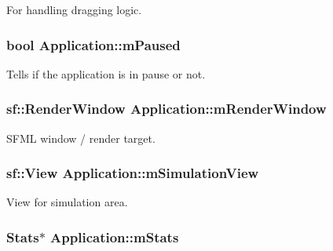 For handling dragging logic. 

\hypertarget{class_application_a29fd44db5b424d85f0fd35eee2494d1e}{
\subsubsection[{m\-Paused}]{\setlength{\rightskip}{0pt plus 5cm}bool Application\-::m\-Paused\hspace{0.3cm}{\ttfamily [private]}}}\label{class_application_a29fd44db5b424d85f0fd35eee2494d1e}


Tells if the application is in pause or not. 

\hypertarget{class_application_acde37e91150ea3a16e9e4849e08c7784}{
\subsubsection[{m\-Render\-Window}]{\setlength{\rightskip}{0pt plus 5cm}sf\-::\-Render\-Window Application\-::m\-Render\-Window\hspace{0.3cm}{\ttfamily [private]}}}\label{class_application_acde37e91150ea3a16e9e4849e08c7784}


S\-F\-M\-L window / render target. 

\hypertarget{class_application_a74a68526ce8ee51762f6d3313355b918}{
\subsubsection[{m\-Simulation\-View}]{\setlength{\rightskip}{0pt plus 5cm}sf\-::\-View Application\-::m\-Simulation\-View\hspace{0.3cm}{\ttfamily [private]}}}\label{class_application_a74a68526ce8ee51762f6d3313355b918}


View for simulation area. 

\hypertarget{class_application_a58c0745f95a42c636a1b914dac2e1ae6}{
\subsubsection[{m\-Stats}]{\setlength{\rightskip}{0pt plus 5cm}Stats$\ast$ Application\-::m\-Stats\hspace{0.3cm}{\ttfamily [private]}}}\label{class_application_a58c0745f95a42c636a1b914dac2e1ae6}


